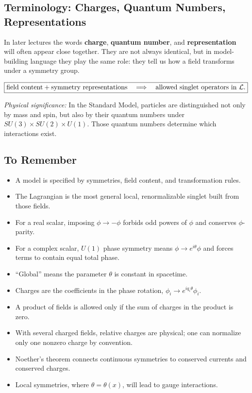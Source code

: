 \documentclass[../main.tex]{subfiles}
\begin{document}
\subsection*{Terminology: Charges, Quantum Numbers, Representations}

In later lectures the words \textbf{charge}, \textbf{quantum number}, and \textbf{representation} will often appear close together.  They are not always identical, but in model-building language they play the same role: they tell us how a field transforms under a symmetry group.

\begin{equation}
  \boxed{
  \text{field content}
  +
  \text{symmetry representations}
  \quad\Longrightarrow\quad
  \text{allowed singlet operators in }\mathcal{L}.}
  \label{eq:lec09:representations-to-lagrangian}
\end{equation}

\textit{Physical significance:} In the Standard Model, particles are distinguished not only by mass and spin, but also by their quantum numbers under $SU(3)\times SU(2)\times U(1)$.  Those quantum numbers determine which interactions exist.

\subsection*{To Remember}

\begin{itemize}
  \item A model is specified by symmetries, field content, and transformation rules.
  \item The Lagrangian is the most general local, renormalizable singlet built from those fields.
  \item For a real scalar, imposing $\phi\to-\phi$ forbids odd powers of $\phi$ and conserves $\phi$-parity.
  \item For a complex scalar, $U(1)$ phase symmetry means $\phi\to e^{i\theta}\phi$ and forces terms to contain equal total phase.
  \item ``Global'' means the parameter $\theta$ is constant in spacetime.
  \item Charges are the coefficients in the phase rotation, $\phi_i\to e^{iq_i\theta}\phi_i$.
  \item A product of fields is allowed only if the sum of charges in the product is zero.
  \item With several charged fields, relative charges are physical; one can normalize only one nonzero charge by convention.
  \item Noether's theorem connects continuous symmetries to conserved currents and conserved charges.
  \item Local symmetries, where $\theta=\theta(x)$, will lead to gauge interactions.
\end{itemize}
\end{document}
